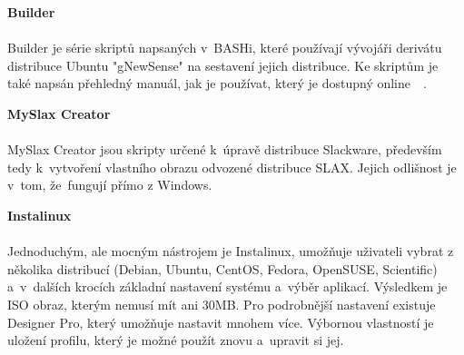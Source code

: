 \documentclass[a4paper,12pt]{article}
\newcommand{\nadpis}[1]{%
	\vspace{4 mm}
	\textbf{#1}\\
	\vspace{4 mm}
	}
\begin{document}

\nadpis{Builder}\\
Builder je série skriptů napsaných v~BASHi, které používají vývojáři derivátu distribuce Ubuntu "gNewSense" na sestavení jejich distribuce. Ke skriptům je také napsán přehledný manuál, jak je používat, který je dostupný online~\cite{Linux_Build}~\cite{BuilderNavod}.


\nadpis{MySlax Creator}\\
MySlax Creator jsou skripty určené k~úpravě distribuce Slackware, především tedy k~vytvoření vlastního obrazu odvozené distribuce SLAX. Jejich odlišnost je v~tom, že~fungují přímo z Windows.


\newpage
\nadpis{Instalinux}\\ \label{sec:Instalinux}
Jednoduchým, ale mocným nástrojem je Instalinux, umožňuje uživateli vybrat z několika distribucí (Debian, Ubuntu, CentOS, Fedora, OpenSUSE, Scientific) a~v~dalších krocích základní nastavení systému a~výběr aplikací. Výsledkem je ISO obraz, kterým nemusí mít ani 30MB. Pro podrobnější nastavení existuje Designer Pro, který umožňuje nastavit mnohem více. Výbornou vlastností je uložení profilu, který je možné použít znovu a~upravit si jej.\\

\end{document}
